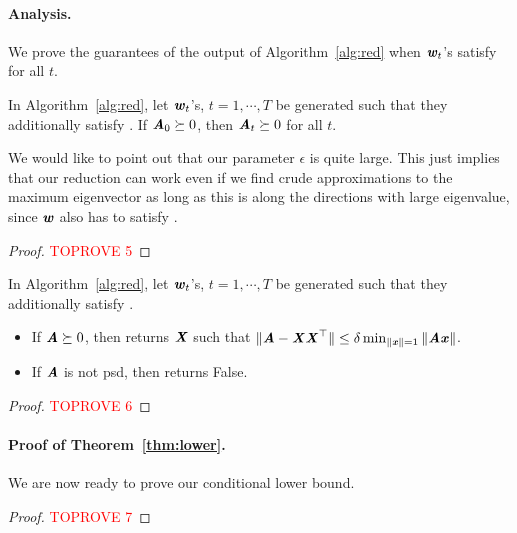 \paragraph{Analysis.}
We prove the guarantees of the output of Algorithm~\ref{alg:red} when $\ww_t$'s satisfy  for all $t$.


\begin{lemma}\label{lem:orthoUpdate}
In Algorithm~\ref{alg:red}, let $\ww_t$'s, $t=1,\cdots, T$ be generated such that they additionally satisfy . If $\AA_0\succeq 0$, then $\AA_t \succeq 0$ for all $t$.
\end{lemma}
 We would like to point out that our parameter $\epsilon$ is quite large. This just implies that our reduction can work even if we find crude approximations to the maximum eigenvector as long as this is along the directions with large eigenvalue, since $\ww$ also has to satisfy .
\begin{proof}\textcolor{red}{TOPROVE 5}\end{proof}


\begin{lemma}\label{lem:RedAns}
In Algorithm~\ref{alg:red}, let $\ww_t$'s, $t=1,\cdots, T$ be generated such that they additionally satisfy . 
\begin{itemize}
    \item If $\AA\succeq 0$, then  returns $\XX$ such that $\|\AA-\XX\XX^{\top}\|\leq \delta \min_{\|\xx\|=1}\|\AA\xx\|$. 
    \item If $\AA$ is not psd, then  returns {\sc False}.
\end{itemize}
\end{lemma}
\begin{proof}\textcolor{red}{TOPROVE 6}\end{proof}


\paragraph{Proof of Theorem~\ref{thm:lower}.} 
We are now ready to prove our conditional lower bound.
\begin{proof}\textcolor{red}{TOPROVE 7}\end{proof}









